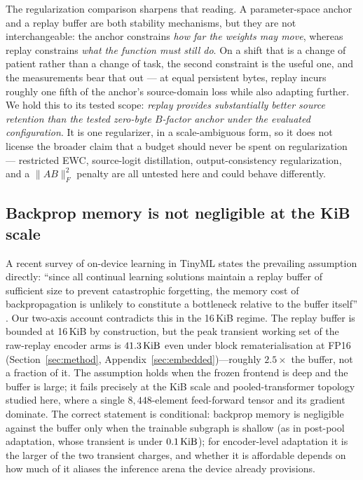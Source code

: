 The regularization comparison sharpens that reading. A parameter-space anchor and
a replay buffer are both stability mechanisms, but they are not
interchangeable: the anchor constrains \emph{how far the weights may move},
whereas replay constrains \emph{what the function must still do}. On a shift that
is a change of patient rather than a change of task, the second constraint is the
useful one, and the measurements bear that out --- at equal persistent bytes,
replay incurs roughly one fifth of the anchor's source-domain loss while also
adapting further. We hold this to its tested scope: \emph{replay provides
substantially better source retention than the tested zero-byte $B$-factor
anchor under the evaluated configuration}. It is one regularizer, in a
scale-ambiguous form, so it does not license the broader claim that a budget
should never be spent on regularization --- restricted EWC, source-logit
distillation, output-consistency regularization, and a $\|AB\|_F^2$ penalty are
all untested here and could behave differently.

\subsection{Backprop memory is not negligible at the KiB scale}

A recent survey of on-device learning in TinyML states the prevailing
assumption directly: ``since all continual learning solutions maintain a replay
buffer of sufficient size to prevent catastrophic forgetting, the memory cost
of backpropagation is unlikely to constitute a bottleneck relative to the buffer
itself'' \cite{pavan2026odlsurvey}. Our two-axis account contradicts this in the
16\,KiB regime. The replay buffer is bounded at 16\,KiB by construction, but the
peak transient working set of the raw-replay encoder arms is $41.3\,\mathrm{KiB}$ even
under block rematerialisation at FP16 (Section~\ref{sec:method},
Appendix~\ref{sec:embedded})---roughly $2.5\times$ the buffer, not a fraction of
it. The assumption holds when the frozen frontend is deep and the buffer is
large; it fails precisely at the KiB scale and pooled-transformer topology
studied here, where a single $8{,}448$-element feed-forward tensor and its
gradient dominate. The correct statement is conditional: backprop memory is
negligible against the buffer only when the trainable subgraph is shallow (as in
post-pool adaptation, whose transient is under $0.1\,\mathrm{KiB}$); for encoder-level
adaptation it is the larger of the two transient charges, and whether it is
affordable depends on how much of it aliases the inference arena the device
already provisions.

